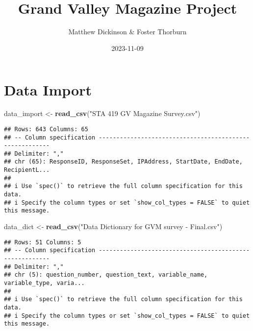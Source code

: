 \documentclass[
]{article}
\title{Grand Valley Magazine Project}
\author{Matthew Dickinson \& Foster Thorburn}
\date{2023-11-09}
\newenvironment{Shaded}{\begin{snugshade}}{\end{snugshade}}
\newcommand{\DecValTok}[1]{\textcolor[rgb]{0.00,0.00,0.81}{#1}}
\newcommand{\FunctionTok}[1]{\textcolor[rgb]{0.13,0.29,0.53}{\textbf{#1}}}
\newcommand{\NormalTok}[1]{#1}
\newcommand{\OtherTok}[1]{\textcolor[rgb]{0.56,0.35,0.01}{#1}}
\newcommand{\SpecialCharTok}[1]{\textcolor[rgb]{0.81,0.36,0.00}{\textbf{#1}}}
\newcommand{\StringTok}[1]{\textcolor[rgb]{0.31,0.60,0.02}{#1}}
\begin{document}
\maketitle

\hypertarget{data-import}{%
\section{Data Import}\label{data-import}}

\begin{Shaded}
\begin{Highlighting}[]
\NormalTok{data\_import }\OtherTok{\textless{}{-}} \FunctionTok{read\_csv}\NormalTok{(}\StringTok{"STA 419 GV Magazine Survey.csv"}\NormalTok{)}
\end{Highlighting}
\end{Shaded}

\begin{verbatim}
## Rows: 643 Columns: 65
## -- Column specification --------------------------------------------------------
## Delimiter: ","
## chr (65): ResponseID, ResponseSet, IPAddress, StartDate, EndDate, RecipientL...
## 
## i Use `spec()` to retrieve the full column specification for this data.
## i Specify the column types or set `show_col_types = FALSE` to quiet this message.
\end{verbatim}

\begin{Shaded}
\begin{Highlighting}[]
\NormalTok{data\_dict }\OtherTok{\textless{}{-}} \FunctionTok{read\_csv}\NormalTok{(}\StringTok{"Data Dictionary for GVM survey {-} Final.csv"}\NormalTok{)}
\end{Highlighting}
\end{Shaded}

\begin{verbatim}
## Rows: 51 Columns: 5
## -- Column specification --------------------------------------------------------
## Delimiter: ","
## chr (5): question_number, question_text, variable_name, variable_type, varia...
## 
## i Use `spec()` to retrieve the full column specification for this data.
## i Specify the column types or set `show_col_types = FALSE` to quiet this message.
\end{verbatim}

\begin{Shaded}
\end{Shaded}
\end{document}
